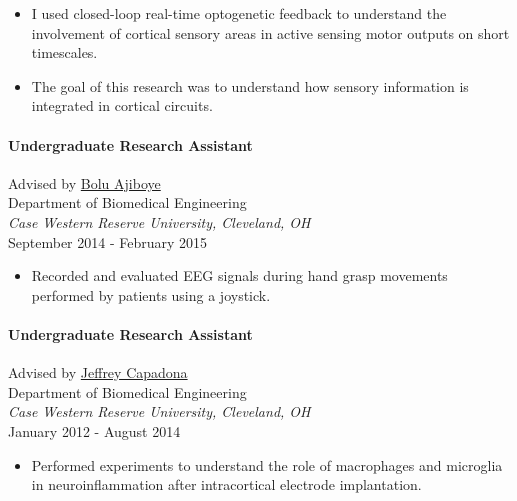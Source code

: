 \documentclass[
  letterpaper,
  DIV=11,
  numbers=noendperiod]{scrartcl}
\let\oldparagraph\paragraph
\renewcommand{\paragraph}[1]{\oldparagraph{#1}\mbox{}}
\providecommand{\tightlist}{%
  \setlength{\itemsep}{0pt}\setlength{\parskip}{0pt}}\usepackage{longtable,booktabs,array}
\begin{document}
\begin{itemize}
\tightlist
\item
  I used closed-loop real-time optogenetic feedback to understand the
  involvement of cortical sensory areas in active sensing motor outputs
  on short timescales.
\item
  The goal of this research was to understand how sensory information is
  integrated in cortical circuits.
\end{itemize}

\hypertarget{undergraduate-research-assistant}{%
\paragraph{Undergraduate Research
Assistant}\label{undergraduate-research-assistant}}

Advised by \href{https://www.braingate.org/team/bolu-ajiboye-ph-d/}{Bolu
Ajiboye}\\
Department of Biomedical Engineering\\
\emph{Case Western Reserve University, Cleveland, OH}\\
September 2014 - February 2015

\begin{itemize}
\tightlist
\item
  Recorded and evaluated EEG signals during hand grasp movements
  performed by patients using a joystick.
\end{itemize}

\hypertarget{undergraduate-research-assistant-1}{%
\paragraph{Undergraduate Research
Assistant}\label{undergraduate-research-assistant-1}}

Advised by \href{https://engineering.case.edu/ebme/capadona}{Jeffrey
Capadona}\\
Department of Biomedical Engineering\\
\emph{Case Western Reserve University, Cleveland, OH}\\
January 2012 - August 2014

\begin{itemize}
\tightlist
\item
  Performed experiments to understand the role of macrophages and
  microglia in neuroinflammation after intracortical electrode
  implantation.
\end{itemize}
\end{document}
